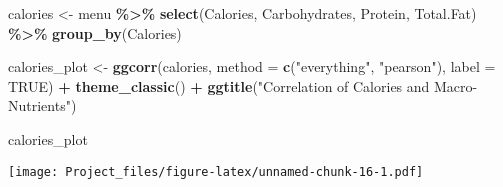 \documentclass[
]{article}
\newenvironment{Shaded}{\begin{snugshade}}{\end{snugshade}}
\newcommand{\AttributeTok}[1]{\textcolor[rgb]{0.13,0.29,0.53}{#1}}
\newcommand{\ConstantTok}[1]{\textcolor[rgb]{0.56,0.35,0.01}{#1}}
\newcommand{\FunctionTok}[1]{\textcolor[rgb]{0.13,0.29,0.53}{\textbf{#1}}}
\newcommand{\NormalTok}[1]{#1}
\newcommand{\OtherTok}[1]{\textcolor[rgb]{0.56,0.35,0.01}{#1}}
\newcommand{\SpecialCharTok}[1]{\textcolor[rgb]{0.81,0.36,0.00}{\textbf{#1}}}
\newcommand{\StringTok}[1]{\textcolor[rgb]{0.31,0.60,0.02}{#1}}
\begin{document}
\begin{Shaded}
\begin{Highlighting}[]
\NormalTok{calories }\OtherTok{\textless{}{-}}\NormalTok{ menu }\SpecialCharTok{\%\textgreater{}\%}
  \FunctionTok{select}\NormalTok{(Calories,}
\NormalTok{         Carbohydrates, }
\NormalTok{         Protein,}
\NormalTok{         Total.Fat) }\SpecialCharTok{\%\textgreater{}\%} 
  \FunctionTok{group\_by}\NormalTok{(Calories)}

\NormalTok{calories\_plot }\OtherTok{\textless{}{-}} \FunctionTok{ggcorr}\NormalTok{(calories,}
       \AttributeTok{method =}  \FunctionTok{c}\NormalTok{(}\StringTok{"everything"}\NormalTok{, }\StringTok{"pearson"}\NormalTok{),}
       \AttributeTok{label =} \ConstantTok{TRUE}\NormalTok{)  }\SpecialCharTok{+} \FunctionTok{theme\_classic}\NormalTok{() }\SpecialCharTok{+}  \FunctionTok{ggtitle}\NormalTok{(}\StringTok{"Correlation of Calories and Macro{-}Nutrients"}\NormalTok{)}

\NormalTok{calories\_plot}
\end{Highlighting}
\end{Shaded}

\texttt{[image: Project\_files/figure-latex/unnamed-chunk-16-1.pdf]}
\end{document}
